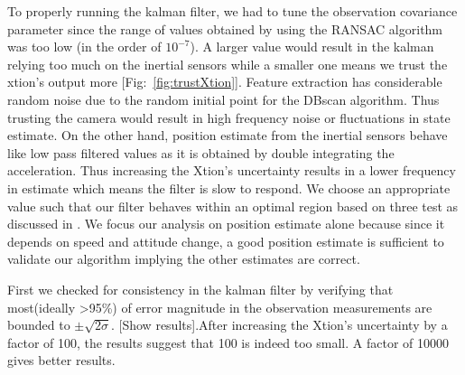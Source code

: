 \documentclass[]{article}
\begin{document}
{To properly running the kalman filter, we had to tune the observation covariance parameter since the range of values obtained by using the RANSAC algorithm was too low (in the order of $10^{-7}$). A larger value would result in the kalman relying too much on the inertial sensors while a smaller one means we trust the xtion's output more [Fig:~\ref{fig:trustXtion}]. Feature extraction has considerable random noise due to the random initial point for the DBscan algorithm. Thus trusting the camera would result in high frequency noise or fluctuations in state estimate. On the other hand, position estimate from the inertial sensors behave like low pass filtered values as it is obtained by double integrating the acceleration. Thus increasing the Xtion's uncertainty results in a lower frequency in estimate which means the filter is slow to respond. We choose an appropriate value such that our filter behaves within an optimal region based on three test as discussed in \cite{KalmanTuning} . We focus our analysis on position estimate alone because since it depends on speed and attitude change, a good position estimate is sufficient to validate our algorithm implying the other estimates are correct. 

First we checked for consistency in the kalman filter by verifying that most(ideally \textgreater 95\%) of error magnitude in the observation measurements are bounded to $\pm\sqrt{2\sigma}$. [Show results].After increasing the Xtion's uncertainty by a factor of 100, the results suggest that 100 is indeed too small. A factor of 10000 gives better results.

}
\end{document}
